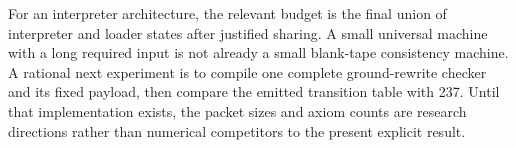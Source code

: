 For an interpreter architecture, the relevant budget is the final union
of interpreter and loader states after justified sharing.  A small
universal machine with a long required input is not already a small
blank-tape consistency machine.  A rational next experiment is to compile
one complete ground-rewrite checker and its fixed payload, then compare
the emitted transition table with 237.  Until that implementation exists,
the packet sizes and axiom counts are research directions rather than
numerical competitors to the present explicit result.

